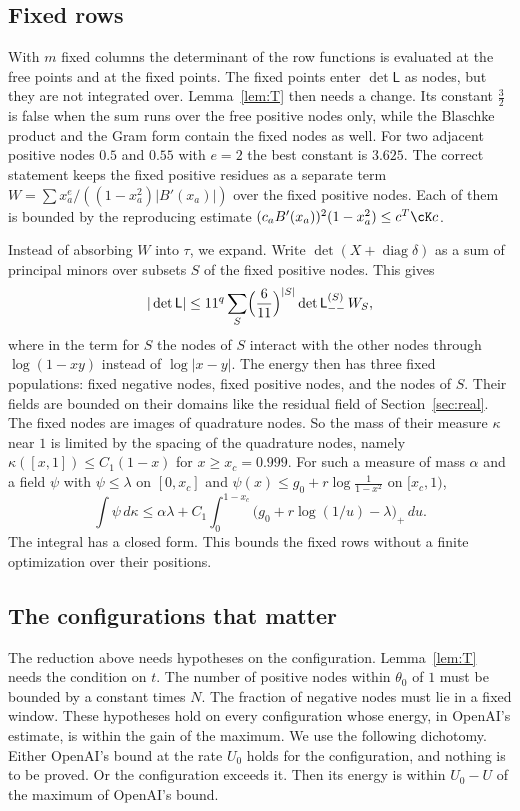 \subsection{Fixed rows}\label{ssec:fixedrows}
With $m$ fixed columns the determinant of the row functions is evaluated at the free points and at the fixed
points. The fixed points enter $\det\mathsf L$ as nodes, but they are not integrated over. Lemma~\ref{lem:T}
then needs a change. Its constant $\frac32$ is false when the sum runs over the free positive nodes only, while
the Blaschke product and the Gram form contain the fixed nodes as well. For two adjacent positive nodes $0.5$
and $0.55$ with $e=2$ the best constant is $3.625$. The correct statement keeps the fixed positive residues as a
separate term $W=\sum x_a^e/((1-x_a^2)|B'(x_a)|)$ over the fixed positive nodes. Each of them is bounded by the
reproducing estimate $(c_aB'(x_a))^2(1-x_a^2)\le c^T\cK c$.

Instead of absorbing $W$ into $\tau$, we expand. Write $\det(X+\operatorname{diag}\delta)$ as a sum of principal
minors over subsets $S$ of the fixed positive nodes. This gives
\[
 |\det\mathsf L|\le11^q\sum_S\Bigl(\frac6{11}\Bigr)^{|S|}\det\mathsf L_{--}^{(S)}\,W_S,
\]
where in the term for $S$ the nodes of $S$ interact with the other nodes through $\log(1-xy)$ instead of
$\log|x-y|$. The energy then has three fixed populations: fixed negative nodes, fixed positive nodes, and the
nodes of $S$. Their fields are bounded on their domains like the residual field of Section~\ref{sec:real}.
The fixed nodes are images of quadrature nodes. So the mass of their measure $\kappa$ near $1$ is limited
by the spacing of the quadrature nodes, namely $\kappa([x,1])\le C_1(1-x)$ for $x\ge x_c=0.999$. For such a measure of mass $\alpha$
and a field $\psi$ with $\psi\le\lambda$ on $[0,x_c]$ and $\psi(x)\le g_0+r\log\frac1{1-x^2}$ on $[x_c,1)$,
\[
 \int\psi\,d\kappa\le\alpha\lambda+C_1\int_0^{1-x_c}\bigl(g_0+r\log(1/u)-\lambda\bigr)_+\,du .
\]
The integral has a closed form. This bounds the fixed rows without a finite optimization over their positions.

\subsection{The configurations that matter}\label{ssec:class}
The reduction above needs hypotheses on the configuration. Lemma~\ref{lem:T} needs the condition on $t$. The
number of positive nodes within $\theta_0$ of $1$ must be bounded by a constant times $N$. The fraction of
negative nodes must lie in a fixed window. These hypotheses hold on every configuration whose energy, in
OpenAI's estimate, is within the gain of the maximum. We use the following dichotomy. Either OpenAI's bound at
the rate $U_0$ holds for the configuration, and nothing is to be proved. Or the configuration exceeds it. Then
its energy is within $U_0-U$ of the maximum of OpenAI's bound.

